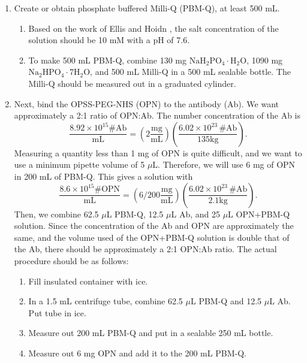 \begin{enumerate}
\item Create or obtain phosphate buffered Milli-Q (PBM-Q), at least 500 mL.

\begin{enumerate}
\item Based on the work of Ellis and Hoidn \citep{hoidnellis}, the salt concentration of the solution should be 10 mM with a pH of 7.6.

\item To make 500 mL PBM-Q, combine 130 mg $\mathrm{NaH_2PO_4\cdot H_2O}$, 1090 mg $\mathrm{Na_2HPO_4\cdot7H_2O}$, and 500 mL Milli-Q in a 500 mL sealable bottle. The Milli-Q should be measured out in a graduated cylinder.

\end{enumerate}

\item Next, bind the OPSS-PEG-NHS (OPN) to the antibody (Ab). We want approximately a 2:1 ratio of OPN:Ab. The number concentration of the Ab is \[\frac{8.92\times10^{15}\#\mathrm{Ab}}{\mathrm{mL}}=\left(2\mathrm{\frac{mg}{mL}}\right)\left(\frac{6.02\times10^{23}\,\#\mathrm{Ab}}{135 \mathrm{kg}}\right).\] 
Measuring a quantity less than 1 mg of OPN is quite difficult, and we want to use a minimum pipette volume of 5 $\mu$L. Therefore, we will use 6 mg of OPN in 200 mL of PBM-Q. This gives a solution with
\[\frac{8.6\times10^{15}\#\mathrm{OPN}}{\mathrm{mL}}=\left(6/200\mathrm{\frac{mg}{mL}}\right)\left(\frac{6.02\times10^{23}\,\#\mathrm{Ab}}{2.1 \mathrm{kg}}\right).\]
Then, we combine 62.5 $\mu$L PBM-Q, 12.5 $\mu$L Ab, and 25 $\mu$L OPN+PBM-Q solution. Since the concentration of the Ab and OPN are approximately the same, and the volume used of the OPN+PBM-Q solution is double that of the Ab, there should be approximately a 2:1 OPN:Ab ratio. The actual procedure should be as follows:

\begin{enumerate}
\item Fill insulated container with ice.

\item In a 1.5 mL centrifuge tube, combine 62.5 $\mu$L PBM-Q and 12.5 $\mu$L Ab. Put tube in ice.

\item Measure out 200 mL PBM-Q and put in a sealable 250 mL bottle.

\item Measure out 6 mg OPN and add it to the 200 mL PBM-Q.


\end{enumerate}
\end{enumerate}
